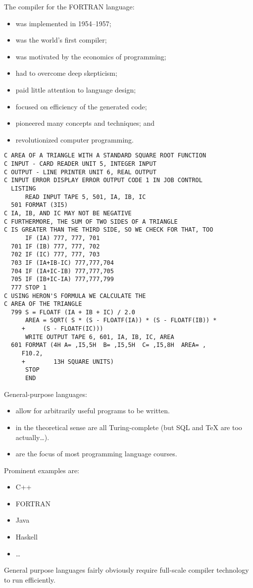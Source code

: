 \begin{slide*}
The compiler for the FORTRAN language:
\begin{itemize}
\item was implemented in 1954--1957;
\item was the world's first compiler;
\item was motivated by the economics of programming;
\item had to overcome deep skepticism;
\item paid little attention to language design;
\item focused on efficiency of the generated code;
\item pioneered many concepts and techniques; and
\item revolutionized computer programming.
\end{itemize}
\vfil
\end{slide*}

\begin{slide*}
{\scriptsize
\begin{verbatim}
C AREA OF A TRIANGLE WITH A STANDARD SQUARE ROOT FUNCTION 
C INPUT - CARD READER UNIT 5, INTEGER INPUT
C OUTPUT - LINE PRINTER UNIT 6, REAL OUTPUT
C INPUT ERROR DISPLAY ERROR OUTPUT CODE 1 IN JOB CONTROL
  LISTING
      READ INPUT TAPE 5, 501, IA, IB, IC
  501 FORMAT (3I5)
C IA, IB, AND IC MAY NOT BE NEGATIVE
C FURTHERMORE, THE SUM OF TWO SIDES OF A TRIANGLE
C IS GREATER THAN THE THIRD SIDE, SO WE CHECK FOR THAT, TOO
      IF (IA) 777, 777, 701
  701 IF (IB) 777, 777, 702
  702 IF (IC) 777, 777, 703
  703 IF (IA+IB-IC) 777,777,704
  704 IF (IA+IC-IB) 777,777,705
  705 IF (IB+IC-IA) 777,777,799
  777 STOP 1
C USING HERON'S FORMULA WE CALCULATE THE
C AREA OF THE TRIANGLE
  799 S = FLOATF (IA + IB + IC) / 2.0
      AREA = SQRT( S * (S - FLOATF(IA)) * (S - FLOATF(IB)) *
     +     (S - FLOATF(IC)))
      WRITE OUTPUT TAPE 6, 601, IA, IB, IC, AREA
  601 FORMAT (4H A= ,I5,5H  B= ,I5,5H  C= ,I5,8H  AREA= ,
     F10.2, 
     +        13H SQUARE UNITS)
      STOP
      END 
\end{verbatim}
} 
\end{slide*}

\begin{slide*}
General-purpose languages:
\begin{itemize}
\item allow for arbitrarily useful programs to be written.
\item in the theoretical sense are all Turing-complete
    (but SQL and TeX are too actually\ldots).
\item are the focus of most programming language courses.
\end{itemize}
Prominent examples are:
\begin{itemize}
\item C++
\item FORTRAN
\item Java
\item Haskell 
\item \ldots
\end{itemize}
General purpose languages fairly obviously require full-scale compiler
technology to run efficiently.
\vfil
\end{slide*}
 

